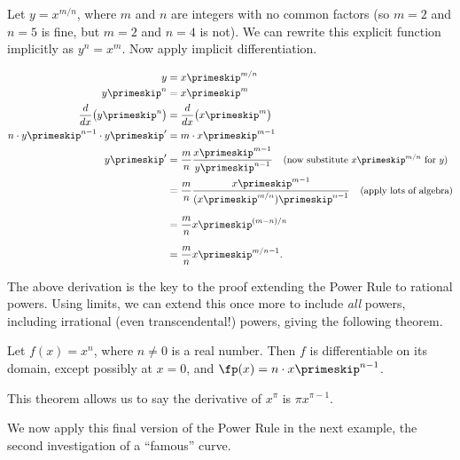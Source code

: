 Let $y = x^{m/n}$, where $m$ and $n$ are integers with no common factors (so $m=2$ and $n=5$ is fine, but $m=2$ and $n=4$ is not). We can rewrite this explicit function implicitly as $y^n = x^m$. Now apply implicit differentiation.

\begin{align*}
y &= x\primeskip^{m/n} \\
y\primeskip^n &= x\primeskip^m \\
\frac{d}{dx}\big(y\primeskip^n\big) &= \frac{d}{dx}\big(x\primeskip^m\big) \\
n\cdot y\primeskip^{n-1}\cdot y\primeskip' &= m\cdot x\primeskip^{m-1} \\
y\primeskip' 	&= \frac{m}{n} \frac{x\primeskip^{m-1}}{y\primeskip^{n-1}} \quad \mbox{\small (now substitute $x\primeskip^{m/n}$ for $y$)} \\
 		&= \frac{m}{n} \frac{x\primeskip^{m-1}}{(x\primeskip^{m/n})\primeskip^{n-1}} \quad \mbox{\small (apply lots of algebra)}\\
		&= \frac{m}n x\primeskip^{(m-n)/n}\rule{0pt}{18pt}\\
		&= \frac{m}n x\primeskip^{m/n -1}.\rule{0pt}{18pt}
\end{align*}

The above derivation is the key to the proof extending the Power Rule to rational powers. Using limits, we can extend this once more to include \textit{all} powers, including irrational (even transcendental!) powers, giving the following theorem.

{Let $f(x) = x^n$, where $n\neq 0$ is a real number. Then $f$ is  differentiable on its domain, except possibly at $x=0$,  and $\fp(x) = n\cdot x\primeskip^{n-1}$.
}

This theorem allows us to say the derivative of $x^\pi$ is $\pi x^{\pi -1}$. 

We now apply this final version of the Power Rule in the next example, the second investigation of a ``famous'' curve.\\

